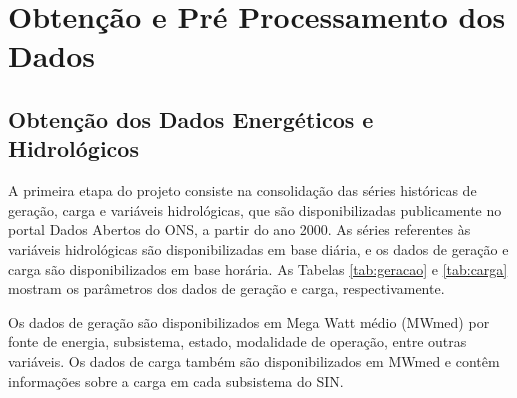 \section{Obtenção e Pré Processamento dos Dados} %
\subsection{Obtenção dos Dados Energéticos e Hidrológicos} %

A primeira etapa do projeto consiste na consolidação das séries históricas de geração, carga e variáveis hidrológicas,
que são disponibilizadas publicamente no portal Dados Abertos do ONS, a partir do ano 2000. As séries referentes 
às variáveis hidrológicas são disponibilizadas em base diária, e os dados de geração e carga são disponibilizados em 
base horária. As Tabelas \ref{tab:geracao} e \ref{tab:carga} mostram os parâmetros dos dados de geração e carga, respectivamente.

Os dados de geração são disponibilizados em Mega Watt médio (MWmed) por fonte de energia, subsistema, estado, 
modalidade de operação, entre outras variáveis. Os dados de carga também são disponibilizados em MWmed e contêm 
informações sobre a carga em cada subsistema do SIN.

\begin{table}[htb]
  \centering
    {
    }
\end{table}

